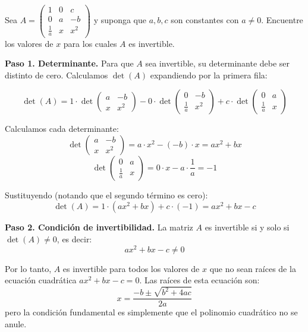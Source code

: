 \begin{prob} 
Sea  \(A= \left(
\begin{array}{ccc}
1 & 0 & c \\
0 & a & -b \\
\frac{1}{a} & x & x^2 
\end{array}
\right) \) y suponga que $a, b, c$ son constantes con $a\neq 0.$ Encuentre los valores de $x$ para los cuales $A$ es invertible.

\begin{myproof}
\textbf{Paso 1. Determinante.} Para que $A$ sea invertible, su determinante debe ser distinto de cero. Calculamos $\det(A)$ expandiendo por la primera fila:

\[
\det(A) = 1 \cdot \det \begin{pmatrix} a & -b \\ x & x^2 \end{pmatrix} 
- 0 \cdot \det \begin{pmatrix} 0 & -b \\ \frac{1}{a} & x^2 \end{pmatrix} 
+ c \cdot \det \begin{pmatrix} 0 & a \\ \frac{1}{a} & x \end{pmatrix}
\]

Calculamos cada determinante:
\[
\det \begin{pmatrix} a & -b \\ x & x^2 \end{pmatrix} = a \cdot x^2 - (-b) \cdot x = a x^2 + b x
\]
\[
\det \begin{pmatrix} 0 & a \\ \frac{1}{a} & x \end{pmatrix} = 0 \cdot x - a \cdot \frac{1}{a} = -1
\]

Sustituyendo (notando que el segundo término es cero):
\[
\det(A) = 1 \cdot (a x^2 + b x) + c \cdot (-1) = a x^2 + b x - c
\]

\textbf{Paso 2. Condición de invertibilidad.} La matriz $A$ es invertible si y solo si $\det(A) \neq 0$, es decir:
\[
a x^2 + b x - c \neq 0
\]

Por lo tanto, $A$ es invertible para todos los valores de $x$ que no sean raíces de la ecuación cuadrática $a x^2 + b x - c = 0$. Las raíces de esta ecuación son:
\[
x = \frac{-b \pm \sqrt{b^2 + 4ac}}{2a}
\]
pero la condición fundamental es simplemente que el polinomio cuadrático no se anule.

\end{myproof}
\end{prob}



